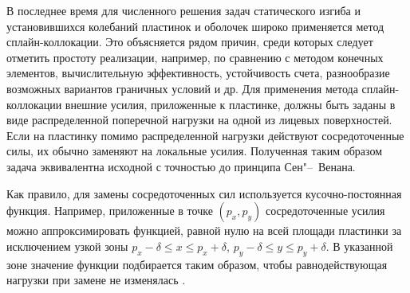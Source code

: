 
\date{26/VII/2011}


\maketitle

\small

В последнее время для численного решения задач статического изгиба и установившихся колебаний пластинок и оболочек широко применяется метод сплайн-коллокации. Это объясняется рядом причин, среди которых следует отметить простоту реализации, например, по сравнению с методом конечных элементов, вычислительную эффективность, устойчивость счета, разнообразие возможных вариантов граничных условий и др. Для применения метода сплайн-коллокации внешние усилия, приложенные к пластинке, должны быть заданы в виде распределенной поперечной нагрузки на одной из лицевых поверхностей. Если на пластинку помимо распределенной нагрузки действуют сосредоточенные силы, их обычно заменяют на локальные усилия. Полученная таким образом задача эквивалентна исходной с точностью до принципа Сен"--~Венана.

Как правило, для замены сосредоточенных сил используется кусочно-постоянная функция. Например, приложенные в точке $\left(p_x, p_y\right)$ сосредоточенные усилия можно аппроксимировать функцией, равной нулю на всей площади пластинки за исключением узкой зоны $p_x-\delta \leqslant x \leqslant p_x + \delta$, $p_y - \delta \leqslant y \leqslant p_y + \delta$. В указанной зоне значение функции подбирается таким образом, чтобы равнодействующая нагрузки при замене не изменялась \cite{saf:grigorenko1996, saf:grigorenko1998}.

